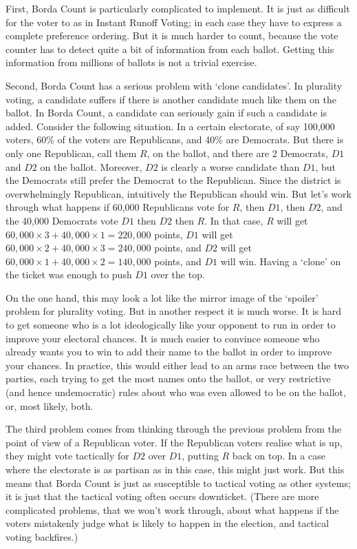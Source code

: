 First, Borda Count is particularly complicated to implement. It is just as difficult for the voter to as in Instant Runoff Voting; in each case they have to express a complete preference ordering. But it is much harder to count, because the vote counter has to detect quite a bit of information from each ballot. Getting this information from millions of ballots is not a trivial exercise.

Second, Borda Count has a serious problem with `clone candidates'. In plurality voting, a candidate suffers if there is another candidate much like them on the ballot. In Borda Count, a candidate can seriously gain if such a candidate is added. Consider the following situation. In a certain electorate, of say 100,000 voters, 60\% of the voters are Republicans, and 40\% are Democrats. But there is only one Republican, call them $R$, on the ballot, and there are 2 Democrats, $D1$ and $D2$ on the ballot. Moreover, $D2$ is clearly a worse candidate than $D1$, but the Democrats still prefer the Democrat to the Republican. Since the district is overwhelmingly Republican, intuitively the Republican should win. But let's work through what happens if 60,000 Republicans vote for $R$, then $D1$, then $D2$, and the 40,000 Democrats vote $D1$ then $D2$ then $R$. In that case, $R$ will get $60,000 \times 3 + 40,000 \times 1 = 220,000$ points, $D1$ will get $60,000 \times 2 + 40,000 \times 3 = 240,000$ points, and $D2$ will get $60,000 \times 1 + 40,000 \times 2 = 140,000$ points, and $D1$ will win. Having a `clone' on the ticket was enough to push $D1$ over the top.

On the one hand, this may look a lot like the mirror image of the `spoiler' problem for plurality voting. But in another respect it is much worse. It is hard to get someone who is a lot ideologically like your opponent to run in order to improve your electoral chances. It is much easier to convince someone who already wants you to win to add their name to the ballot in order to improve your chances. In practice, this would either lead to an arms race between the two parties, each trying to get the most names onto the ballot, or very restrictive (and hence undemocratic) rules about who was even allowed to be on the ballot, or, most likely, both.

The third problem comes from thinking through the previous problem from the point of view of a Republican voter. If the Republican voters realise what is up, they might vote tactically for $D2$ over $D1$, putting $R$ back on top. In a case where the electorate is as partisan as in this case, this might just work. But this means that Borda Count is just as susceptible to tactical voting as other systems; it is just that the tactical voting often occurs downticket. (There are more complicated problems, that we won't work through, about what happens if the voters mistakenly judge what is likely to happen in the election, and tactical voting backfires.)


